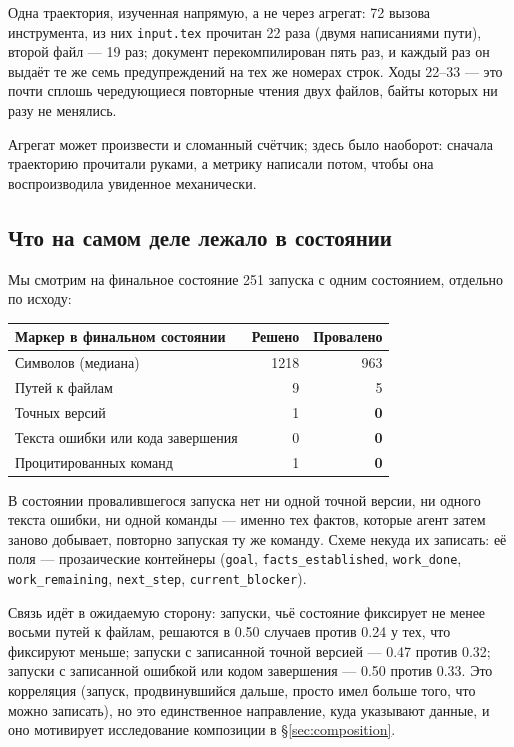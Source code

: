 Одна траектория, изученная напрямую, а не через агрегат\live: 72 вызова
инструмента, из них \texttt{input.tex} прочитан 22 раза (двумя написаниями
пути), второй файл — 19 раз; документ перекомпилирован пять раз, и каждый
раз он выдаёт те же семь предупреждений на тех же номерах строк. Ходы
22--33 — это почти сплошь чередующиеся повторные чтения двух файлов, байты
которых ни разу не менялись.

Агрегат может произвести и сломанный счётчик; здесь было наоборот: сначала
траекторию прочитали руками, а метрику написали потом, чтобы она
воспроизводила увиденное механически.

\subsection{Что на самом деле лежало в состоянии}

Мы смотрим на финальное состояние 251 запуска с одним состоянием, отдельно
по исходу\live:

\begin{center}
\begin{tabular}{@{}lrr@{}}
\toprule
Маркер в финальном состоянии & Решено & Провалено \\
\midrule
Символов (медиана)      & 1218 & 963 \\
Путей к файлам               & 9    & 5 \\
Точных версий    & 1    & \textbf{0} \\
Текста ошибки или кода завершения  & 0    & \textbf{0} \\
Процитированных команд          & 1    & \textbf{0} \\
\bottomrule
\end{tabular}
\end{center}

В состоянии провалившегося запуска нет ни одной точной версии, ни одного
текста ошибки, ни одной команды — именно тех фактов, которые агент затем
заново добывает, повторно запуская ту же команду. Схеме некуда их записать:
её поля — прозаические контейнеры (\texttt{goal},
\texttt{facts\_established}, \texttt{work\_done}, \texttt{work\_remaining},
\texttt{next\_step}, \texttt{current\_blocker}).

Связь идёт в ожидаемую сторону\live: запуски, чьё состояние фиксирует не
менее восьми путей к файлам, решаются в 0.50 случаев против 0.24 у тех, что
фиксируют меньше; запуски с записанной точной версией — 0.47 против 0.32;
запуски с записанной ошибкой или кодом завершения — 0.50 против 0.33. Это
корреляция (запуск, продвинувшийся дальше, просто имел больше того, что
можно записать), но это единственное направление, куда указывают данные, и
оно мотивирует исследование композиции в \S\ref{sec:composition}.

